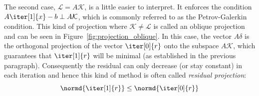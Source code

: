 The second case, $\mathcal{L}=A\mathcal{K}$, is a little easier to interpret. It enforces the condition $A\iter[1]{x}-b \perp A\mathcal{K}$, which is commonly referred to as the Petrov-Galerkin condition. This kind of projection where $\mathcal{K} \neq \mathcal{L}$ is called an oblique projection and can be seen in Figure~\hyperref[fig:projection_oblique]{\ref{fig:projection_oblique}}. In this case, the vector $A\delta$ is the orthogonal projection of the vector $\iter[0]{r}$ onto the subspace $A\mathcal{K}$, which guarantees that $\iter[1]{r}$ will be minimal (as established in the previous paragraph). Consequently the residual can only decrease (or stay constant) in each iteration and hence this kind of method is often called \textit{residual projection}:
\begin{equation}
    \normd{\iter[1]{r}}\leq \normd{\iter[0]{r}}
\end{equation}

